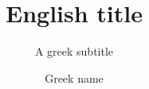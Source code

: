 \documentclass[hide notes greek]{beamer}
\title{\foreignlanguage{english}{English title}}
\subtitle{A greek subtitle}
\institute{A greek name institute}
\author{Greek name}
\date{}
\begin{document}
    \begin{frame}
        \titlepage
    \end{frame}
\end{document}

